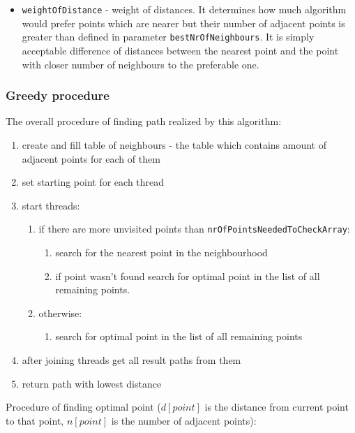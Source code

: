 \documentclass[titlepage]{article}
\begin{document}
\begin{itemize}
	\item \texttt{weightOfDistance} - weight of distances. It determines how much algorithm would prefer points which are nearer but their number of adjacent points is greater than defined in parameter \texttt{bestNrOfNeighbours}. It is simply acceptable difference of distances between the nearest point and the point with closer number of neighbours to the preferable one.
	
\end{itemize}

\subsubsection{Greedy procedure}

The overall procedure of finding path realized by this algorithm:

\begin{enumerate}
	\item create and fill table of neighbours - the table which contains amount of adjacent points for each of them
	\item set starting point for each thread
	\item start threads:
	\begin{enumerate}[label*=\arabic*.]
		\item if there are more unvisited points than \texttt{nrOfPointsNeededToCheckArray}:
		\begin{enumerate}[label*=\arabic*.]
			\item search for the nearest point in the neighbourhood
			\item if point wasn't found search for optimal point in the list of all remaining points.
		\end{enumerate}
		\item otherwise:
		\begin{enumerate}[label*=\arabic*.]
			\item search for optimal point in the list of all remaining points
		\end{enumerate}
	\end{enumerate}
	\item after joining threads get all result paths from them
	\item return path with lowest distance
\end{enumerate}

Procedure of finding optimal point ($d[point]$ is the distance from current point to that point, $n[point]$ is the number of adjacent points):
\end{document}
